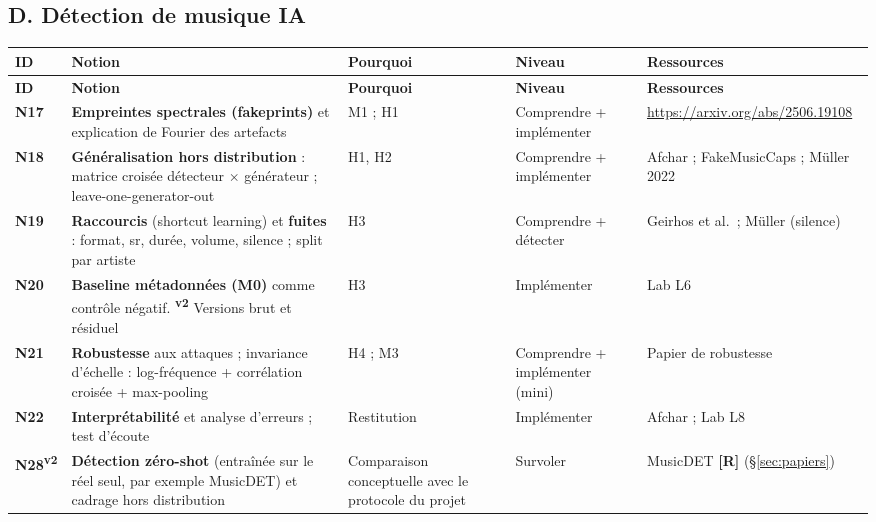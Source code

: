 \documentclass[11pt,a4paper]{article}
\providecommand{\og}{\guillemotleft\nobreakspace}%
\providecommand{\fg}{\nobreakspace\guillemotright}}
\newcommand{\vtwo}{\textsuperscript{\textcolor{orange!80!black}{\textbf{v2}}}}
\newcommand{\lR}{\textbf{\textcolor{orange!80!black}{[R]}}}
\begin{document}
\subsection{D. Détection de musique IA}
{\footnotesize
\begin{longtable}{L{0.95cm}L{4.1cm}L{4.6cm}L{2.2cm}L{3.3cm}}
\toprule
\textbf{ID} & \textbf{Notion} & \textbf{Pourquoi} & \textbf{Niveau} & \textbf{Ressources}\\
\midrule
\endfirsthead
\toprule
\textbf{ID} & \textbf{Notion} & \textbf{Pourquoi} & \textbf{Niveau} & \textbf{Ressources}\\
\midrule
\endhead
\bottomrule
\endfoot
\textbf{N17} & \textbf{Empreintes spectrales (fakeprints)} et explication de Fourier des artefacts & M1 ; H1 & Comprendre + implémenter & \url{https://arxiv.org/abs/2506.19108}\\
\addlinespace
\textbf{N18} & \textbf{Généralisation hors distribution} : matrice croisée détecteur $\times$ générateur ; leave-one-generator-out & H1, H2 & Comprendre + implémenter & Afchar ; FakeMusicCaps ; Müller 2022\\
\addlinespace
\textbf{N19} & \textbf{Raccourcis} (shortcut learning) et \textbf{fuites} : format, sr, durée, volume, silence ; split par artiste & H3 & Comprendre + détecter & Geirhos et al.\ ; Müller (silence)\\
\addlinespace
\textbf{N20} & \textbf{Baseline métadonnées (M0)} comme contrôle négatif. \vtwo{} Versions brut et résiduel & H3 & Implémenter & Lab L6\\
\addlinespace
\textbf{N21} & \textbf{Robustesse} aux attaques ; invariance d'échelle : log-fréquence + corrélation croisée + max-pooling & H4 ; M3 & Comprendre + implémenter (mini) & Papier de robustesse\\
\addlinespace
\textbf{N22} & \textbf{Interprétabilité} et analyse d'erreurs ; test d'écoute & Restitution & Implémenter & Afchar ; Lab L8\\
\addlinespace
\textbf{N28}\vtwo & \textbf{Détection \og{}zéro-shot\fg{}} (entraînée sur le réel seul, par exemple MusicDET) et cadrage hors distribution & Comparaison conceptuelle avec le protocole du projet & Survoler & MusicDET \lR{} (§\ref{sec:papiers})\\
\end{longtable}}
\end{document}
